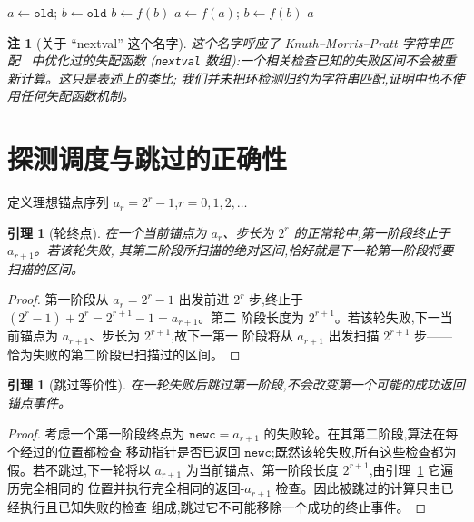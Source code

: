 \documentclass[11pt]{ctexart}
\newtheorem{lemma}[theorem]{引理}
\newtheorem{remark}[theorem]{注}
\newcommand{\oldc}{\texttt{old}}
\newcommand{\newc}{\texttt{newc}}
\begin{document}
\begin{algorithm}[p]
\footnotesize
\caption{\textsc{LocateEntry}$(\oldc,\lambda)$ —— 给定 $\lambda$ 后恢复入口}
\label{alg:locate}
\begin{algorithmic}[1]
\State \(a\gets \oldc\); \(b\gets \oldc\)
 \State \(b\gets f(b)\) \EndFor
{} \State \(a\gets f(a)\); \(b\gets f(b)\) \EndWhile
\State \Return \(a\)
\end{algorithmic}
\end{algorithm}

\begin{remark}[关于 ``nextval'' 这个名字]
这个名字呼应了 Knuth--Morris--Pratt 字符串匹配~\cite{kmp1977} 中优化过的失配函数
(\texttt{nextval} 数组):一个相关检查已知的失败区间不会被重新计算。这只是表述上的类比;
我们并未把环检测归约为字符串匹配,证明中也不使用任何失配函数机制。
\end{remark}

\section{探测调度与跳过的正确性}
\label{sec:schedule}

定义理想锚点序列 $a_r=2^r-1$,$r=0,1,2,\dots$

\begin{lemma}[轮终点]
\label{lem:endpoints}
在一个当前锚点为 $a_r$、步长为 $2^r$ 的正常轮中,第一阶段终止于 $a_{r+1}$。若该轮失败,
其第二阶段所扫描的绝对区间,恰好就是下一轮第一阶段将要扫描的区间。
\end{lemma}

\begin{proof}
第一阶段从 $a_r=2^r-1$ 出发前进 $2^r$ 步,终止于 $(2^r-1)+2^r=2^{r+1}-1=a_{r+1}$。第二
阶段长度为 $2^{r+1}$。若该轮失败,下一当前锚点为 $a_{r+1}$、步长为 $2^{r+1}$,故下一第一
阶段将从 $a_{r+1}$ 出发扫描 $2^{r+1}$ 步——恰为失败的第二阶段已扫描过的区间。
\end{proof}

\begin{lemma}[跳过等价性]
\label{lem:skip}
在一轮失败后跳过第一阶段,不会改变第一个可能的成功返回锚点事件。
\end{lemma}

\begin{proof}
考虑一个第一阶段终点为 $\newc=a_{r+1}$ 的失败轮。在其第二阶段,算法在每个经过的位置都检查
移动指针是否已返回 $\newc$;既然该轮失败,所有这些检查都为假。若不跳过,下一轮将以
$a_{r+1}$ 为当前锚点、第一阶段长度 $2^{r+1}$,由引理~\ref{lem:endpoints} 它遍历完全相同的
位置并执行完全相同的返回-$a_{r+1}$ 检查。因此被跳过的计算只由已经执行且已知失败的检查
组成,跳过它不可能移除一个成功的终止事件。
\end{proof}
\end{document}
